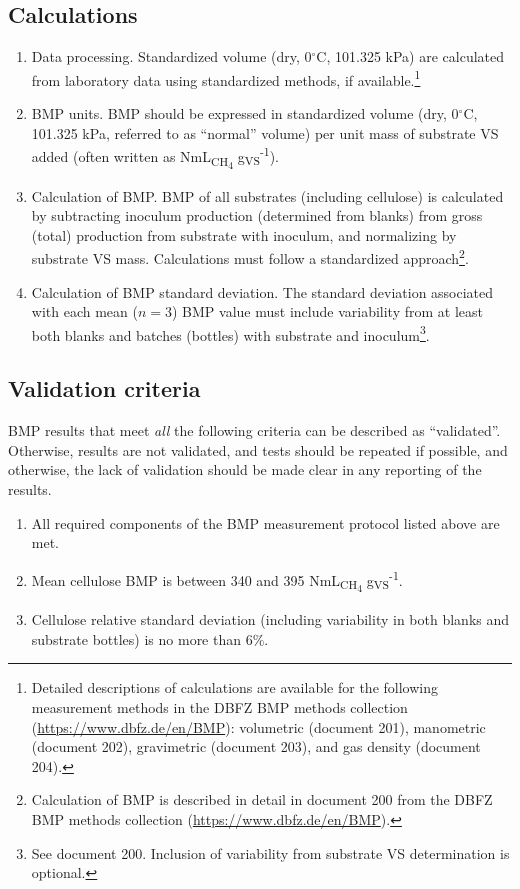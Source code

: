 \documentclass[]{article}
\begin{document}
\subsection{Calculations}
\begin{enumerate}
  \item Data processing.
    Standardized  volume (dry, 0$^\circ$C, 101.325 kPa) are calculated from laboratory data using standardized methods, if available.\footnote{
      Detailed descriptions of calculations are available for the following measurement methods in the DBFZ BMP methods collection (\url{https://www.dbfz.de/en/BMP}): volumetric (document 201), manometric (document 202), gravimetric (document 203), and gas density (document 204).
    }
  \item BMP units.
    BMP should be expressed in standardized  volume (dry, 0$^\circ$C, 101.325 kPa, referred to as ``normal'' volume) per unit mass of substrate VS added (often written as NmL\textsubscript{CH\textsubscript{4}} g\textsubscript{VS}\textsuperscript{-1}). 
  \item Calculation of BMP.
    BMP of all substrates (including cellulose) is calculated by subtracting inoculum  production (determined from blanks) from gross (total)  production from substrate with inoculum, and normalizing by substrate VS mass.
    Calculations must follow a standardized approach\footnote{
      Calculation of BMP is described in detail in document 200 from the DBFZ BMP methods collection (\url{https://www.dbfz.de/en/BMP}).
    }.
  \item Calculation of BMP standard deviation.
    The standard deviation associated with each mean ($n = 3$) BMP value must include variability from at least both blanks and batches (bottles) with substrate and inoculum\footnote{
      See document 200. 
      Inclusion of variability from substrate VS determination is optional.
    }.
\end{enumerate}

\subsection{Validation criteria}
\label{sec:crit}
BMP results that meet \textit{all} the following criteria can be described as ``validated''.
Otherwise, results are not validated, and tests should be repeated if possible, and otherwise, the lack of validation should be made clear in any reporting of the results.

\begin{enumerate}
  \item All required components of the BMP measurement protocol listed above are met.
  \item Mean cellulose BMP is between 340 and 395 NmL\textsubscript{CH\textsubscript{4}} g\textsubscript{VS}\textsuperscript{-1}.
  \item Cellulose relative standard deviation (including variability in both blanks and substrate bottles) is no more than 6\%.
\end{enumerate}
\end{document}
